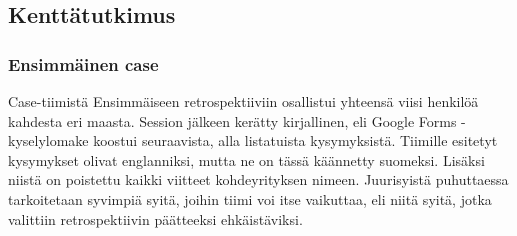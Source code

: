 \subsection{Kenttätutkimus}
\subsubsection{Ensimmäinen case}
Case-tiimistä Ensimmäiseen retrospektiiviin osallistui yhteensä viisi henkilöä kahdesta eri maasta.
Session jälkeen kerätty kirjallinen, eli Google Forms -kyselylomake koostui seuraavista, alla listatuista kysymyksistä. Tiimille esitetyt kysymykset olivat englanniksi, mutta ne on tässä käännetty suomeksi. Lisäksi niistä on poistettu kaikki viitteet kohdeyrityksen nimeen. Juurisyistä puhuttaessa tarkoitetaan syvimpiä syitä, joihin tiimi voi itse vaikuttaa, eli niitä syitä, jotka valittiin retrospektiivin päätteeksi ehkäistäviksi.

